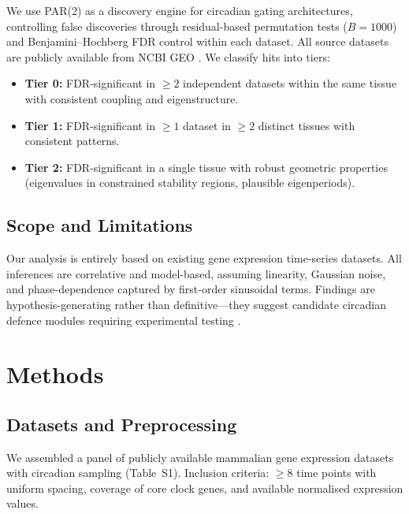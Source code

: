 \documentclass[11pt,letterpaper]{article}
\begin{document}
We use PAR(2) as a discovery engine for circadian gating architectures, controlling false discoveries through residual-based permutation tests ($B = 1000$) and Benjamini--Hochberg FDR control \citep{benjamini1995controlling} within each dataset. All source datasets are publicly available from NCBI GEO \citep{barrett2013ncbi}. We classify hits into tiers:

\begin{itemize}
\item \textbf{Tier 0:} FDR-significant in $\geq 2$ independent datasets within the same tissue with consistent coupling and eigenstructure.
\item \textbf{Tier 1:} FDR-significant in $\geq 1$ dataset in $\geq 2$ distinct tissues with consistent patterns.
\item \textbf{Tier 2:} FDR-significant in a single tissue with robust geometric properties (eigenvalues in constrained stability regions, plausible eigenperiods).
\end{itemize}

\subsection{Scope and Limitations}

Our analysis is entirely based on existing gene expression time-series datasets. All inferences are correlative and model-based, assuming linearity, Gaussian noise, and phase-dependence captured by first-order sinusoidal terms. Findings are hypothesis-generating rather than definitive---they suggest candidate circadian defence modules requiring experimental testing \citep{levine2020circadian}.

\section{Methods}

\subsection{Datasets and Preprocessing}

We assembled a panel of publicly available mammalian gene expression datasets with circadian sampling (Table~S1). Inclusion criteria: $\geq 8$ time points with uniform spacing, coverage of core clock genes, and available normalised expression values.
\end{document}
